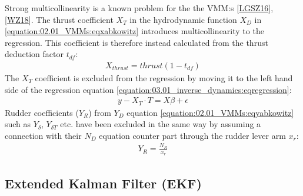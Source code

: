 \documentclass[review]{elsarticle}
\begin{document}
\sphinxAtStartPar
Strong multicollinearity is a known problem for the the VMM:s {[}\hyperlink{cite.bibligraphy:id36}{LGSZ16}{]}, {[}\hyperlink{cite.bibligraphy:id58}{WZ18}{]}.
The thrust coefficient \(X_T\) in the hydrodynamic function \(X_D\) in \autoref{equation:02.01_VMMs:eqxabkowitz} introduces multicollinearity to the regression. This coefficient is therefore instead calculated from the thrust deduction factor \(t_{df}\):
\begin{equation}\label{equation:03.01_inverse_dynamics:eqXthrust}
\begin{split}\displaystyle X_{thrust} = thrust \left(1 - t_{df}\right)\end{split}
\end{equation}
\sphinxAtStartPar
The \(X_T\) coefficient is excluded from the regression by moving it to the left hand side of the regression equation \autoref{equation:03.01_inverse_dynamics:eqregression}:
\begin{equation}\label{equation:03.01_inverse_dynamics:eqexclude}
\begin{split}y-X_T \cdot T = X \beta + \epsilon\end{split}
\end{equation}
\sphinxAtStartPar
Rudder coefficients (\(Y_R\)) from \(Y_D\) equation \autoref{equation:02.01_VMMs:eqyabkowitz} such as \(Y_{\delta}\), \(Y_{\delta T}\) etc. have been excluded in the same way by assuming a connection with their \(N_D\) equation counter part through the rudder lever arm \(x_r\):
\begin{equation}\label{equation:03.01_inverse_dynamics:eqyr}
\begin{split}\displaystyle Y_{R} = \frac{N_{R}}{x_{r}}\end{split}
\end{equation}

\subsection{Extended Kalman Filter (EKF)}
\label{\detokenize{04.01_EK:extended-kalman-filter-ekf}}\label{\detokenize{04.01_EK::doc}}
\end{document}
